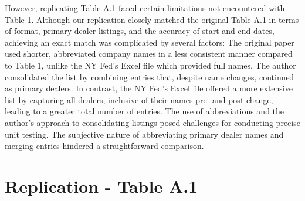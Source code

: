 \documentclass{article}
\begin{document}
However, replicating Table A.1 faced certain limitations not encountered with Table 1. Although our replication closely matched the original Table A.1 in terms of format, primary dealer listings, and the accuracy of start and end dates, achieving an exact match was complicated by several factors: The original paper used shorter, abbreviated company names in a less consistent manner compared to Table 1, unlike the NY Fed's Excel file which provided full names. The author consolidated the list by combining entries that, despite name changes, continued as primary dealers. In contrast, the NY Fed's Excel file offered a more extensive list by capturing all dealers, inclusive of their names pre- and post-change, leading to a greater total number of entries. The use of abbreviations and the author's approach to consolidating listings posed challenges for conducting precise unit testing. The subjective nature of abbreviating primary dealer names and merging entries hindered a straightforward comparison.





\clearpage

\small {\section{Replication - Table A.1}}

\begin{table}[ht]
\begin{adjustbox}{width=\textwidth}

\end{adjustbox}
\end{table}
\clearpage
\end{document}
